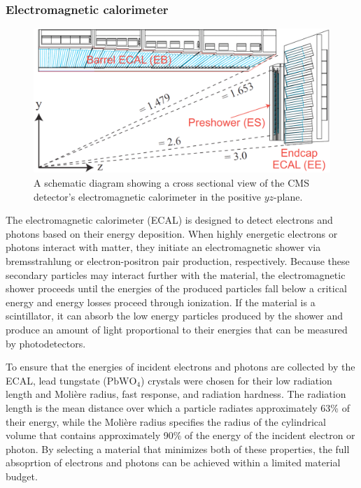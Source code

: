 \subsubsection{Electromagnetic calorimeter}

\begin{figure}[htbp]
  \centering
    \includegraphics[width=5.5in]{images/ecal_diagram}
    \caption[Schematic for the CMS ECAL]{A schematic diagram showing a cross sectional view of the CMS detector's electromagnetic calorimeter in the positive $yz$-plane.\cite{ECALDIAGRAM}}
    \label{fig:CMSecaldiag}
\end{figure}

The electromagnetic calorimeter (ECAL) is designed to detect electrons and photons based on their energy deposition. When highly energetic electrons or photons interact with matter, they initiate an electromagnetic shower via bremsstrahlung or electron-positron pair production, respectively. Because these secondary particles may interact further with the material, the electromagnetic shower proceeds until the energies of the produced particles fall below a critical energy and energy losses proceed through ionization. If the material is a scintillator, it can absorb the low energy particles produced by the shower and produce an amount of light proportional to their energies that can be measured by photodetectors.

To ensure that the energies of incident electrons and photons are collected by the ECAL, lead tungstate ($\mathrm{PbWO}_{4}$) crystals were chosen for their low radiation length and Moli{\`e}re radius, fast response, and radiation hardness. The radiation length is the mean distance over which a particle radiates approximately 63\% of their energy, while the Moli{\`e}re radius specifies the radius of the cylindrical volume that contains approximately 90\% of the energy of the incident electron or photon. By selecting a material that minimizes both of these properties, the full absoprtion of electrons and photons can be achieved within a limited material budget.

